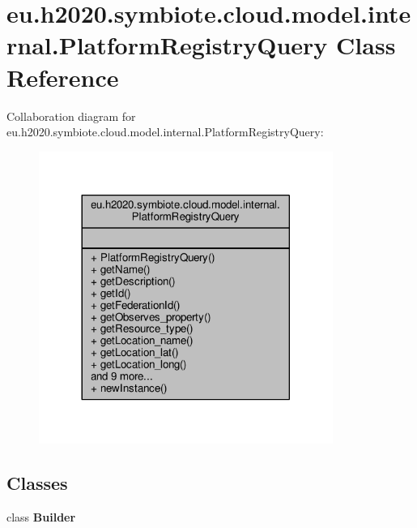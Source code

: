 \hypertarget{classeu_1_1h2020_1_1symbiote_1_1cloud_1_1model_1_1internal_1_1PlatformRegistryQuery}{}\section{eu.\+h2020.\+symbiote.\+cloud.\+model.\+internal.\+Platform\+Registry\+Query Class Reference}
\label{classeu_1_1h2020_1_1symbiote_1_1cloud_1_1model_1_1internal_1_1PlatformRegistryQuery}


Collaboration diagram for eu.\+h2020.\+symbiote.\+cloud.\+model.\+internal.\+Platform\+Registry\+Query\+:
\nopagebreak
\begin{figure}[H]
\begin{center}
\leavevmode
\includegraphics[width=272pt]{classeu_1_1h2020_1_1symbiote_1_1cloud_1_1model_1_1internal_1_1PlatformRegistryQuery__coll__graph}
\end{center}
\end{figure}
\subsection*{Classes}
\begin{DoxyCompactItemize}
\item 
class {\bfseries Builder}
\end{DoxyCompactItemize}
